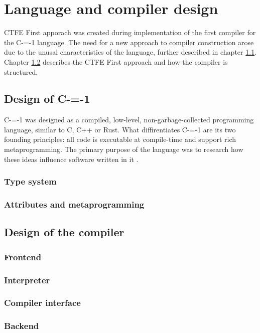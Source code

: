 \section{Language and compiler design}

CTFE First apporach was created during implementation of the first compiler for the C-=-1 language\cite{grabski2022compilation}.
The need for a new approach to compiler construction arose due to the unusal characteristics of the language, further described in chapter \ref{language-design}.
Chapter \ref{compiler-design} describes the CTFE First approach and how the compiler is structured. 

\subsection{Design of C-=-1}
\label{language-design}

C-=-1 was designed as a compiled, low-level, non-garbage-collected programming language, similar to C, C++ or Rust.
What diffirentiates C-=-1 are its two founding principles: all code is executable at compile-time and support rich metaprogramming.
The primary purpose of the language was to research how these ideas influence software written in it \cite{grabski2022compilation}.

\subsubsection{Type system}

\subsubsection{Attributes and metaprogramming}

\subsection{Design of the compiler}
\label{compiler-design}
\subsubsection{Frontend}

\subsubsection{Interpreter}

\subsubsection{Compiler interface}

\subsubsection{Backend}
